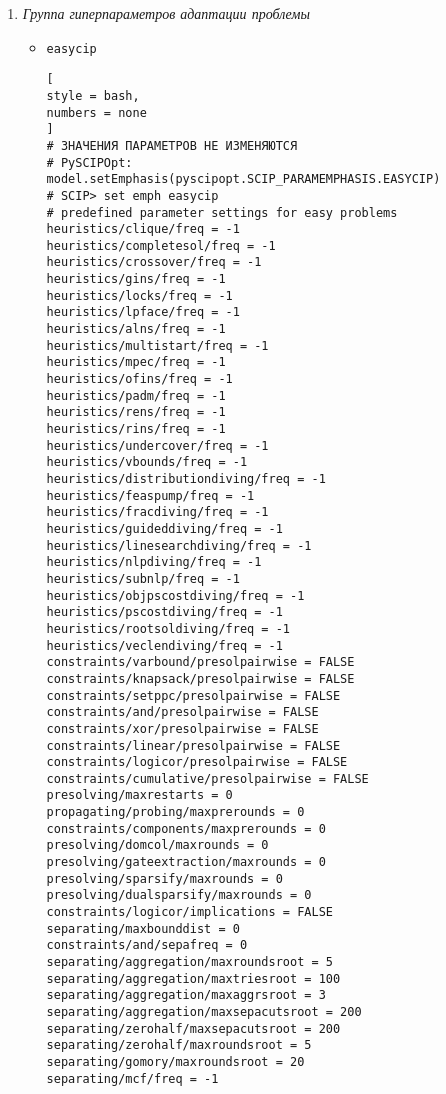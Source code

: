\documentclass[%
	11pt,
	a4paper,
	utf8,
		]{article}
\begin{document}
\begin{enumerate}
    \item \emph{Группа гиперпараметров адаптации проблемы}
    \begin{itemize}
    	\item \verb|easycip|
\begin{lstlisting}[
style = bash,
numbers = none
]
# ЗНАЧЕНИЯ ПАРАМЕТРОВ НЕ ИЗМЕНЯЮТСЯ
# PySCIPOpt: model.setEmphasis(pyscipopt.SCIP_PARAMEMPHASIS.EASYCIP)
# SCIP> set emph easycip
# predefined parameter settings for easy problems
heuristics/clique/freq = -1
heuristics/completesol/freq = -1
heuristics/crossover/freq = -1
heuristics/gins/freq = -1
heuristics/locks/freq = -1
heuristics/lpface/freq = -1
heuristics/alns/freq = -1
heuristics/multistart/freq = -1
heuristics/mpec/freq = -1
heuristics/ofins/freq = -1
heuristics/padm/freq = -1
heuristics/rens/freq = -1
heuristics/rins/freq = -1
heuristics/undercover/freq = -1
heuristics/vbounds/freq = -1
heuristics/distributiondiving/freq = -1
heuristics/feaspump/freq = -1
heuristics/fracdiving/freq = -1
heuristics/guideddiving/freq = -1
heuristics/linesearchdiving/freq = -1
heuristics/nlpdiving/freq = -1
heuristics/subnlp/freq = -1
heuristics/objpscostdiving/freq = -1
heuristics/pscostdiving/freq = -1
heuristics/rootsoldiving/freq = -1
heuristics/veclendiving/freq = -1
constraints/varbound/presolpairwise = FALSE
constraints/knapsack/presolpairwise = FALSE
constraints/setppc/presolpairwise = FALSE
constraints/and/presolpairwise = FALSE
constraints/xor/presolpairwise = FALSE
constraints/linear/presolpairwise = FALSE
constraints/logicor/presolpairwise = FALSE
constraints/cumulative/presolpairwise = FALSE
presolving/maxrestarts = 0
propagating/probing/maxprerounds = 0
constraints/components/maxprerounds = 0
presolving/domcol/maxrounds = 0
presolving/gateextraction/maxrounds = 0
presolving/sparsify/maxrounds = 0
presolving/dualsparsify/maxrounds = 0
constraints/logicor/implications = FALSE
separating/maxbounddist = 0
constraints/and/sepafreq = 0
separating/aggregation/maxroundsroot = 5
separating/aggregation/maxtriesroot = 100
separating/aggregation/maxaggrsroot = 3
separating/aggregation/maxsepacutsroot = 200
separating/zerohalf/maxsepacutsroot = 200
separating/zerohalf/maxroundsroot = 5
separating/gomory/maxroundsroot = 20
separating/mcf/freq = -1
\end{lstlisting}


\end{itemize}
\end{enumerate}
\end{document}
